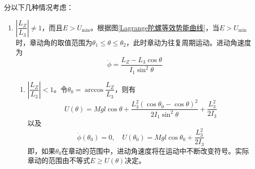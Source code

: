 分以下几种情况考虑：
\begin{enumerate}
	\item $\left|\dfrac{L_Z}{L_3}\right| \neq 1$，而且$E>U_{\min}$。根据图\ref{Lagrange陀螺等效势能曲线}，当$E>U_{\min}$时，章动角的取值范围为$\theta_1 \leqslant \theta \leqslant \theta_2$，此时章动为往复周期运动。进动角速度为
	\begin{equation*}
		\dot{\phi} = \frac{L_Z-L_3 \cos \theta}{I_1\sin^2 \theta}
	\end{equation*}
	\begin{enumerate}
		\item $\left|\dfrac{L_Z}{L_3}\right| < 1$。令$\theta_0 = \arccos \dfrac{L_Z}{L_3}$，则有
		\begin{equation*}
			U(\theta) = Mgl\cos \theta + \frac{L_3^2(\cos \theta_0-\cos \theta)^2}{2I_1\sin^2 \theta} + \frac{L_3^2}{2I_3}
		\end{equation*}
		以及
		\begin{equation*}
			\dot{\phi}(\theta_0) = 0,\quad U(\theta_0) = Mgl\cos \theta_0 + \frac{L_3^2}{2I_3}
		\end{equation*}
		即，如果$\theta_0$在章动的范围中，进动角速度将在运动中不断改变符号。实际章动的范围由不等式$E \geqslant U(\theta)$决定。
		

\end{enumerate}
\end{enumerate}
